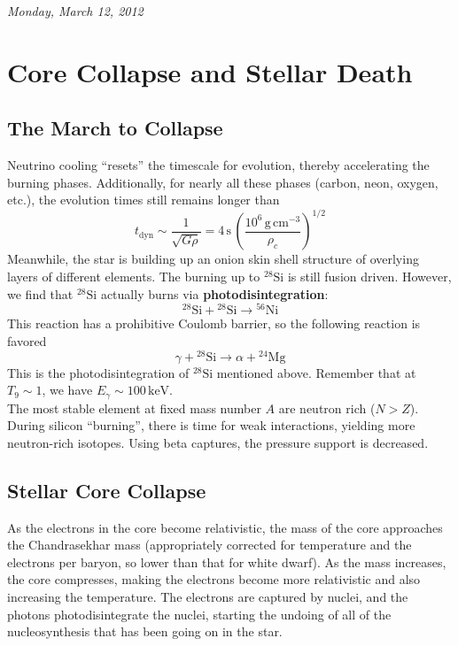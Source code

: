 \documentclass[10pt]{article}
\numberwithin{equation}{section}
\newcommand{\n}{\noindent}
\begin{document}
    \n \textit{Monday, March 12, 2012}\\
    
\section{Core Collapse and Stellar Death}
	\label{sec:core-collapse} 
	\subsection{The March to Collapse}
	\label{sec:march-to-collapse}
	Neutrino cooling ``resets'' the timescale for evolution, thereby 
accelerating the burning phases. Additionally, for nearly all these phases 
(carbon, neon, oxygen, etc.), the evolution times still remains longer than
	\begin{equation}
	\label{eq:364} t_{\mathrm{dyn}}\sim\frac{1}{\sqrt{G\rho}}=4\,\mathrm{s}
\,\left(\frac{10^{6}\,\mathrm{g\,cm^{-3}}}{\rho_{c}}\right)^{1/2}
	\end{equation}
	Meanwhile, the star is building up an onion skin shell structure of 
overlying layers of different elements. The burning up to ${}^{28}\mathrm
{Si}$ is still fusion driven. However, we find that ${}^{28}\mathrm{Si}$ actually burns via 
\textbf{photodisintegration}:
	\begin{equation}
	\label{eq:365}{}^{28}\mathrm{Si}+{}^{28}\mathrm{Si}\to{}^{56}\mathrm
{Ni}
	\end{equation}
	This reaction has a prohibitive Coulomb barrier, so the following 
reaction is favored
	\begin{equation}
	\label{eq:366} \gamma+{}^{28}\mathrm{Si}\to\alpha+{}^{24}\mathrm{Mg}
	\end{equation}
	This is the photodisintegration of $\mathrm{{}^{28}Si}$
        mentioned above. Remember that at $T_{9}\sim 1$, we have
        $E_{\gamma}\sim 100\,\mathrm{keV}$.\\
	
	\n The most stable element at fixed mass number $A$ are neutron rich 
($N>Z$). During silicon ``burning'', there is time for weak interactions, 
yielding more neutron-rich isotopes. Using beta captures, the pressure 
support is decreased.
	\subsection{Stellar Core Collapse}
	As the electrons in the core become relativistic, the mass of the core 
approaches the Chandrasekhar mass (appropriately corrected for temperature 
and the electrons per baryon, so lower than that for white dwarf). As the 
mass increases, the core compresses, making the electrons become more 
relativistic and also increasing the temperature. The electrons are 
captured by nuclei, and the photons photodisintegrate the nuclei, starting 
the undoing of all of the nucleosynthesis that has been going on in the 
star.\\
\end{document}
